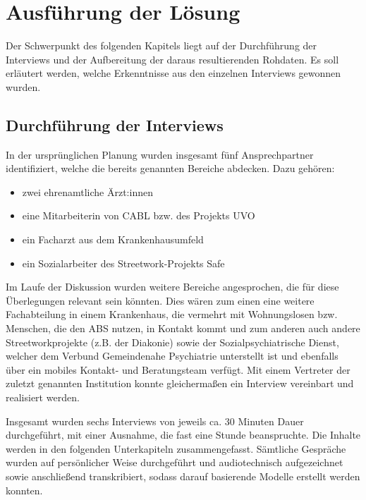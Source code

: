 \chapter{Ausführung der Lösung}\label{ch:solution}

Der Schwerpunkt des folgenden Kapitels liegt auf der Durchführung der Interviews und der Aufbereitung der daraus resultierenden Rohdaten. Es soll erläutert werden, welche Erkenntnisse aus den einzelnen Interviews gewonnen wurden.

\section{Durchführung der Interviews}\label{sec:interviews}

In der ursprünglichen Planung wurden insgesamt fünf Ansprechpartner identifiziert, welche die bereits genannten Bereiche abdecken. Dazu gehören:

\begin{itemize}
	\item zwei ehrenamtliche Ärzt:innen
	\item eine Mitarbeiterin von \ac{CABL} bzw. des Projekts \acs{UVO}
	\item ein Facharzt aus dem Krankenhausumfeld
	\item ein Sozialarbeiter des Streetwork-Projekts \acs{Safe}
\end{itemize}

Im Laufe der Diskussion wurden weitere Bereiche angesprochen, die für diese Überlegungen relevant sein könnten. Dies wären zum einen eine weitere Fachabteilung in einem Krankenhaus, die vermehrt mit Wohnungslosen bzw. Menschen, die den \ac{ABS} nutzen, in Kontakt kommt und zum anderen auch andere Streetworkprojekte (z.B. der Diakonie) sowie der Sozialpsychiatrische Dienst, welcher dem Verbund Gemeindenahe Psychiatrie unterstellt ist und ebenfalls über ein mobiles Kontakt- und Beratungsteam verfügt. Mit einem Vertreter der zuletzt genannten Institution konnte gleichermaßen ein Interview vereinbart und realisiert werden.

Insgesamt wurden sechs Interviews von jeweils ca. 30 Minuten Dauer durchgeführt, mit einer Ausnahme, die fast eine Stunde beanspruchte. Die Inhalte werden in den folgenden Unterkapiteln zusammengefasst. Sämtliche Gespräche wurden auf persönlicher Weise durchgeführt und audiotechnisch aufgezeichnet sowie anschließend transkribiert, sodass darauf basierende Modelle erstellt werden konnten.

